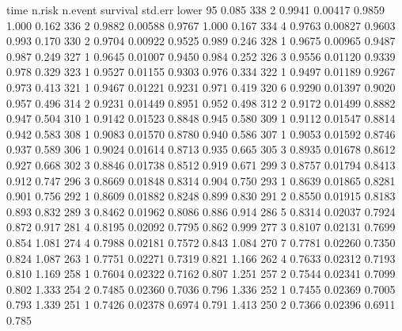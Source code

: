 \documentclass[handout,12pt,dvipsnames,t]{beamer}
\begin{document}
\begin{frame}[fragile]
{\begin{Schunk}
\begin{Soutput}
   time n.risk n.event survival std.err lower 95%
  0.085    338       2   0.9941 0.00417       0.9859        1.000
  0.162    336       2   0.9882 0.00588       0.9767        1.000
  0.167    334       4   0.9763 0.00827       0.9603        0.993
  0.170    330       2   0.9704 0.00922       0.9525        0.989
  0.246    328       1   0.9675 0.00965       0.9487        0.987
  0.249    327       1   0.9645 0.01007       0.9450        0.984
  0.252    326       3   0.9556 0.01120       0.9339        0.978
  0.329    323       1   0.9527 0.01155       0.9303        0.976
  0.334    322       1   0.9497 0.01189       0.9267        0.973
  0.413    321       1   0.9467 0.01221       0.9231        0.971
  0.419    320       6   0.9290 0.01397       0.9020        0.957
  0.496    314       2   0.9231 0.01449       0.8951        0.952
  0.498    312       2   0.9172 0.01499       0.8882        0.947
  0.504    310       1   0.9142 0.01523       0.8848        0.945
  0.580    309       1   0.9112 0.01547       0.8814        0.942
  0.583    308       1   0.9083 0.01570       0.8780        0.940
  0.586    307       1   0.9053 0.01592       0.8746        0.937
  0.589    306       1   0.9024 0.01614       0.8713        0.935
  0.665    305       3   0.8935 0.01678       0.8612        0.927
  0.668    302       3   0.8846 0.01738       0.8512        0.919
  0.671    299       3   0.8757 0.01794       0.8413        0.912
  0.747    296       3   0.8669 0.01848       0.8314        0.904
  0.750    293       1   0.8639 0.01865       0.8281        0.901
  0.756    292       1   0.8609 0.01882       0.8248        0.899
  0.830    291       2   0.8550 0.01915       0.8183        0.893
  0.832    289       3   0.8462 0.01962       0.8086        0.886
  0.914    286       5   0.8314 0.02037       0.7924        0.872
  0.917    281       4   0.8195 0.02092       0.7795        0.862
  0.999    277       3   0.8107 0.02131       0.7699        0.854
  1.081    274       4   0.7988 0.02181       0.7572        0.843
  1.084    270       7   0.7781 0.02260       0.7350        0.824
  1.087    263       1   0.7751 0.02271       0.7319        0.821
  1.166    262       4   0.7633 0.02312       0.7193        0.810
  1.169    258       1   0.7604 0.02322       0.7162        0.807
  1.251    257       2   0.7544 0.02341       0.7099        0.802
  1.333    254       2   0.7485 0.02360       0.7036        0.796
  1.336    252       1   0.7455 0.02369       0.7005        0.793
  1.339    251       1   0.7426 0.02378       0.6974        0.791
  1.413    250       2   0.7366 0.02396       0.6911        0.785

\end{Soutput}
\end{Schunk}}
\end{frame}
\end{document}
